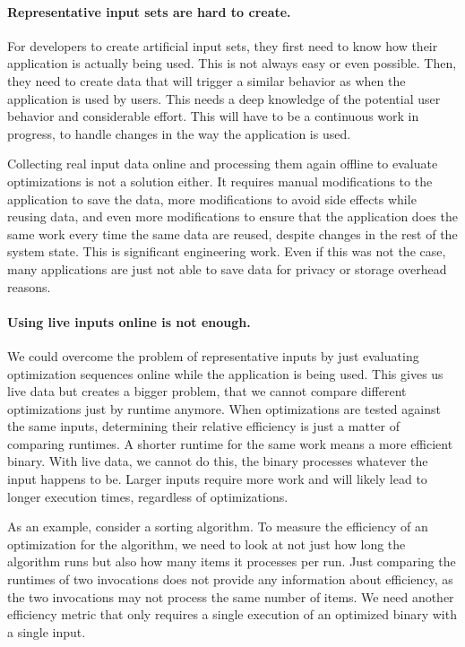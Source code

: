     
    \paragraph{Representative input sets are hard to create.} For developers to create artificial input sets, they first need to know how
    their application is actually being used. This is not always easy or even possible. Then, they need to create data that will trigger a
    similar behavior as when the application is used by users. This needs a deep knowledge of the potential user behavior and
    considerable effort. This will have to be a continuous work in
    progress, to handle changes in the way the application is used.

    Collecting real input data online and processing them again offline to evaluate optimizations is not a solution either. It requires
    manual modifications to the application to save the data, more modifications to avoid side effects while reusing data, and even more
    modifications to ensure that the application does the same work every time the same data are reused, despite changes in the rest of
    the system state. 
    This is significant engineering work. Even if this was not the case, many applications are just not able to save
    data for privacy or storage overhead reasons. 

    \paragraph{Using live inputs online is not enough.} We could overcome the problem of representative inputs by just evaluating
    optimization sequences online while the application is being used. This gives us live data but creates a bigger problem, that we cannot
    compare different optimizations just by runtime anymore. When optimizations are tested against the same inputs, determining their
    relative efficiency is just a matter of comparing runtimes. A shorter runtime for the same work means a more efficient binary.
    With live data, we cannot do this, the binary processes whatever the input happens to be. Larger inputs require more work and will
    likely lead to longer execution times, regardless of optimizations.
    
    As an example, consider a sorting algorithm. To measure the efficiency of an optimization for the algorithm, we need to look at not just
    how long the algorithm runs but also how many items it processes per run. Just comparing the runtimes of two invocations does not
    provide any information about efficiency, as the two invocations may not process the same number of items. We need another efficiency metric
    that only requires a single execution of an optimized binary with a single input.

